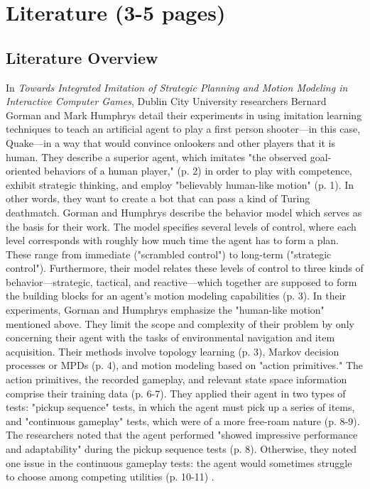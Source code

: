 \chapter{Literature (3-5 pages)}
\label{ch:Literature}



\section{Literature Overview}

In {\it Towards Integrated Imitation of Strategic Planning and Motion Modeling in Interactive Computer Games}, Dublin City University researchers Bernard Gorman and Mark Humphrys detail their experiments in using imitation learning techniques to teach an artificial agent to play a first person shooter—in this case, Quake—in a way that would convince onlookers and other players that it is human. They describe a superior agent, which imitates "the observed goal-oriented behaviors of a human player," (p. 2) in order to play with competence, exhibit strategic thinking, and employ "believably human-like motion" (p. 1). In other words, they want to create a bot that can pass a kind of Turing deathmatch. Gorman and Humphrys describe the behavior model which serves as the basis for their work. The model specifies several levels of control, where each level corresponds with roughly how much time the agent has to form a plan. These range from immediate ("scrambled control") to long-term ("strategic control"). Furthermore, their model relates these levels of control to three kinds of behavior—strategic, tactical, and reactive—which together are supposed to form the building blocks for an agent's motion modeling capabilities (p. 3). In their experiments, Gorman and Humphrys emphasize the "human-like motion" mentioned above. They limit the scope and complexity of their problem by only concerning their agent with the tasks of environmental navigation and item acquisition. Their methods involve topology learning (p. 3), Markov decision processes or MPDs (p. 4), and motion modeling based on "action primitives." The action primitives, the recorded gameplay, and relevant state space information comprise their training data (p. 6-7). They applied their agent in two types of tests: "pickup sequence" tests, in which the agent must pick up a series of items, and "continuous gameplay" tests, which were of a more free-roam nature (p. 8-9). The researchers noted that the agent performed "showed impressive performance and adaptability" during the pickup sequence tests (p. 8). Otherwise, they noted one issue in the continuous gameplay tests: the agent would sometimes struggle to choose among competing utilities (p. 10-11) \cite{Gorman:2006:TII:1178418.1178432}.

